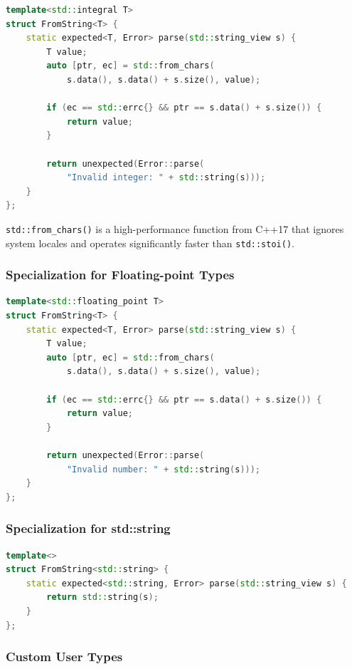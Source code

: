 \begin{lstlisting}[language=C++, basicstyle=\small\ttfamily, caption={FromString for integers}]
template<std::integral T>
struct FromString<T> {
    static expected<T, Error> parse(std::string_view s) {
        T value;
        auto [ptr, ec] = std::from_chars(
            s.data(), s.data() + s.size(), value);
        
        if (ec == std::errc{} && ptr == s.data() + s.size()) {
            return value;
        }
        
        return unexpected(Error::parse(
            "Invalid integer: " + std::string(s)));
    }
};
\end{lstlisting}

\texttt{std::from\_chars()} is a high-performance function from C++17 that ignores system locales and operates significantly faster than \texttt{std::stoi()}.

\subsubsection{Specialization for Floating-point Types}

\begin{lstlisting}[language=C++, basicstyle=\small\ttfamily, caption={FromString for floating-point}]
template<std::floating_point T>
struct FromString<T> {
    static expected<T, Error> parse(std::string_view s) {
        T value;
        auto [ptr, ec] = std::from_chars(
            s.data(), s.data() + s.size(), value);
        
        if (ec == std::errc{} && ptr == s.data() + s.size()) {
            return value;
        }
        
        return unexpected(Error::parse(
            "Invalid number: " + std::string(s)));
    }
};
\end{lstlisting}

\subsubsection{Specialization for std::string}

\begin{lstlisting}[language=C++, basicstyle=\small\ttfamily, caption={FromString for string}]
template<>
struct FromString<std::string> {
    static expected<std::string, Error> parse(std::string_view s) {
        return std::string(s);
    }
};
\end{lstlisting}

\subsubsection{Custom User Types}

